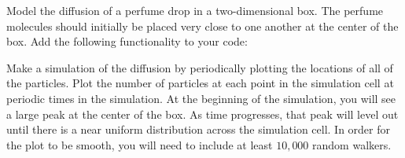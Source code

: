 \begin{enumerate}
\probtwo  Model the diffusion of a perfume drop in a two-dimensional
box. The perfume molecules should initially be placed very close to
one another at the center of the box. Add the following functionality
to your code:
\begin{enumerate}
\subprob  Make a simulation of the diffusion by periodically plotting
the locations of all of the particles.
\subprob Plot the number of particles at each point in the simulation
cell at periodic times in the simulation.  At the beginning of the
simulation, you will see a large peak at the center of the box.  As
time progresses, that peak will level out until there is a near
uniform distribution across the simulation cell.  In order for the
plot to be smooth, you will need to include at least $10,000$ random walkers.
\end{enumerate}
\end{enumerate}

